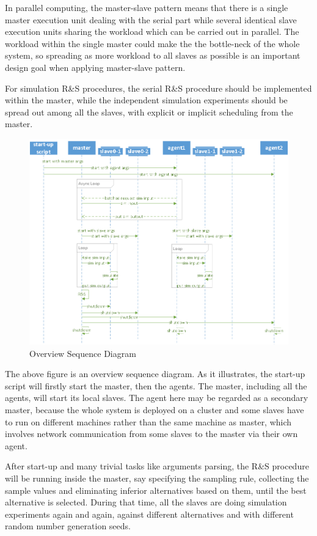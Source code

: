 In parallel computing, the master-slave pattern means that there is a single master execution unit dealing with the serial part while several identical slave execution units sharing the workload which can be carried out in parallel. The workload within the single master could make the the bottle-neck of the whole system, so spreading as more workload to all slaves as possible is an important design goal when applying master-slave pattern.

For simulation R\&S procedures, the serial R\&S procedure should be implemented within the master, while the independent simulation experiments should be spread out among all the slaves, with explicit or implicit scheduling from the master.

\begin{figure}[ht]
\centering
\includegraphics[width=120mm]{overview_seq.png}
\caption{Overview Sequence Diagram}
\end{figure}

The above figure is an overview sequence diagram. As it illustrates, the start-up script will firstly start the master, then the agents. The master, including all the agents, will start its local slaves. The agent here may be regarded as a secondary master, because the whole system is deployed on a cluster and some slaves have to run on different machines rather than the same machine as master, which involves network communication from some slaves to the master via their own agent.

After start-up and many trivial tasks like arguments parsing, the R\&S procedure will be running inside the master, say specifying the sampling rule, collecting the sample values and eliminating inferior alternatives based on them, until the best alternative is selected. During that time, all the slaves are doing simulation experiments again and again, against different alternatives and with different random number generation seeds.

